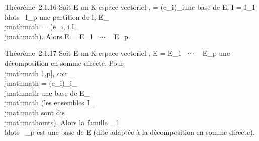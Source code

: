 Théorème~2.1.16 Soit E un K-espace vectoriel ,  =
(e_i)_i\inI une base de E, I = I_1
\cup\\ldots~ \cup
I_p une partition de I, E_\\jmathmath =\
\mathrmVect(e_i, i \in I_\\jmathmath). Alors
E = E_1 \oplus~⋯ \oplus~ E_p.

Théorème~2.1.17 Soit E un K-espace vectoriel , E = E_1
\oplus~⋯ \oplus~ E_p une décomposition en somme
directe. Pour \\jmathmath \in {[}1,p{]}, soit _\\jmathmath =
(e_i)_i\inI_\\jmathmath une base de E_\\jmathmath (les
ensembles I_\\jmathmath sont dis\\jmathmathoints). Alors la famille _1
\cup\\ldots~
\cup{}_p est une base de E (dite adaptée à la décomposition en
somme directe).
